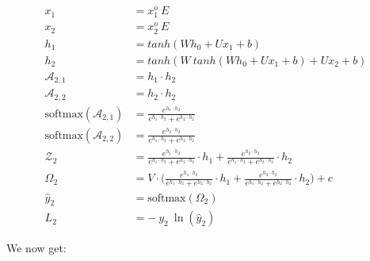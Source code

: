 \documentclass{article}
\begin{document}
\begin{align*}
 x_1 &= x^o_1 ~ E \\
  x_2 &= x^o_2 ~ E \\
h_1 &= tanh(W h_0 +Ux_1 +b)\\
	h_2 &= tanh(W~tanh(W h_0 +Ux_1 +b)+Ux_2 +b)\\
 \mathcal{A}_{2,1} &= h_1 \cdot h_2\\
 \mathcal{A}_{2,2} &=h_2 \cdot h_2 \\
\text{softmax}(\mathcal{A}_{2,1}) &= \frac{e^{h_1 \cdot h_2 }}{ e^{h_1 \cdot h_2}+e^{h_2 \cdot h_2}} \\
\text{softmax}(\mathcal{A}_{2,2}) &= \frac{e^{h_2 \cdot h_2 }}{ e^{h_1 \cdot h_2}+e^{h_2 \cdot h_2}}\\
\mathcal{Z}_2 &= \frac{e^{h_1 \cdot h_2 }}{ e^{h_1 \cdot h_2}+e^{h_2 \cdot h_2}} \cdot h_1 +\frac{e^{h_2 \cdot h_2 }}{ e^{h_1 \cdot h_2}+e^{h_2 \cdot h_2}} \cdot h_2\\
\Omega_2 &= V \cdot \bigg(\frac{e^{h_1 \cdot h_2 }}{ e^{h_1 \cdot h_2}+e^{h_2 \cdot h_2}} \cdot h_1 +\frac{e^{h_2 \cdot h_2 }}{ e^{h_1 \cdot h_2}+e^{h_2 \cdot h_2}} \cdot h_2 \bigg) + c\\
\hat{y}_2 &= \text{softmax}(\Omega_2)\\
        L_2 &= -~y_2~\ln{(\hat{y}_2)}
\end{align*}

We now get:
\end{document}
